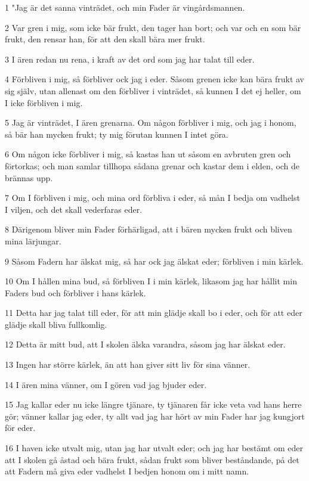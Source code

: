 \par 1 "Jag är det sanna vinträdet, och min Fader är vingårdsmannen.
\par 2 Var gren i mig, som icke bär frukt, den tager han bort; och var och en som bär frukt, den rensar han, för att den skall bära mer frukt.
\par 3 I ären redan nu rena, i kraft av det ord som jag har talat till eder.
\par 4 Förbliven i mig, så förbliver ock jag i eder. Såsom grenen icke kan bära frukt av sig själv, utan allenast om den förbliver i vinträdet, så kunnen I det ej heller, om I icke förbliven i mig.
\par 5 Jag är vinträdet, I ären grenarna. Om någon förbliver i mig, och jag i honom, så bär han mycken frukt; ty mig förutan kunnen I intet göra.
\par 6 Om någon icke förbliver i mig, så kastas han ut såsom en avbruten gren och förtorkas; och man samlar tillhopa sådana grenar och kastar dem i elden, och de brännas upp.
\par 7 Om I förbliven i mig, och mina ord förbliva i eder, så mån I bedja om vadhelst I viljen, och det skall vederfaras eder.
\par 8 Därigenom bliver min Fader förhärligad, att i bären mycken frukt och bliven mina lärjungar.
\par 9 Såsom Fadern har älskat mig, så har ock jag älskat eder; förbliven i min kärlek.
\par 10 Om I hållen mina bud, så förbliven I i min kärlek, likasom jag har hållit min Faders bud och förbliver i hans kärlek.
\par 11 Detta har jag talat till eder, för att min glädje skall bo i eder, och för att eder glädje skall bliva fullkomlig.
\par 12 Detta är mitt bud, att I skolen älska varandra, såsom jag har älskat eder.
\par 13 Ingen har större kärlek, än att han giver sitt liv för sina vänner.
\par 14 I ären mina vänner, om I gören vad jag bjuder eder.
\par 15 Jag kallar eder nu icke längre tjänare, ty tjänaren får icke veta vad hans herre gör; vänner kallar jag eder, ty allt vad jag har hört av min Fader har jag kungjort för eder.
\par 16 I haven icke utvalt mig, utan jag har utvalt eder; och jag har bestämt om eder att I skolen gå åstad och bära frukt, sådan frukt som bliver beståndande, på det att Fadern må giva eder vadhelst I bedjen honom om i mitt namn.
